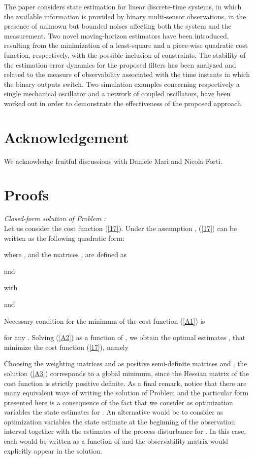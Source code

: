 \documentclass[11pt,journal,onecolumn]{IEEEtran}
\begin{document}
The paper considers state estimation for linear discrete-time systems, in which the available information is provided by binary multi-sensor observations,
in the presence of unknown but bounded noises affecting both the system and the measurement. Two novel moving-horizon estimators have been introduced, resulting from the minimization of a least-square and a piece-wise quadratic cost function, respectively, with the possible inclusion of constraints. The stability of the estimation error dynamics for the proposed filters has been analyzed and related to the measure of observability
associated with the time instants in which the binary outputs switch. Two simulation examples concerning respectively a single mechanical oscillator and a network of coupled oscillators, have been worked out in order to demonstrate the effectiveness of the proposed approach.

\section*{Acknowledgement}

We acknowledge fruitful discussions with Daniele Mari and Nicola Forti.

\appendix

\section{Proofs}

{\em Closed-form solution of Problem :}\\
Let us consider the cost function (\ref{17}). Under the assumption , (\ref{17}) can be written as the following quadratic form:

where ,  and the matrices ,  are defined as

and

with

and

Necessary condition for the minimum of the cost function (\ref{A1}) is

for any . Solving (\ref{A2}) as a function of , we obtain the optimal estimates ,  that minimize the cost function (\ref{17}), namely

Choosing the weighting matrices  and  as positive semi-definite matrices and , the solution (\ref{A3}) corresponds to a global minimum, since the Hessian matrix  of the cost function is strictly positive definite. As a final remark, notice that there are many equivalent ways of writing the solution of Problem  and the particular form presented here is a consequence of the fact
that we consider as optimization variables the state estimates  for . An alternative would be to consider as optimization variables the state estimate
 at the beginning of the observation interval together with the estimates of the process disturbance  for
. In this case, each   would be written as a function of  and the observability matrix would explicitly appear in the solution.
\mbox{ } \hfill 
\vspace{.5cm}
\end{document}
